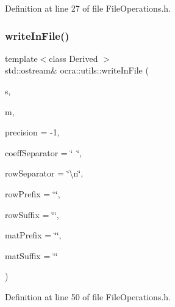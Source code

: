 Definition at line 27 of file File\+Operations.\+h.

\hypertarget{namespaceocra_1_1utils_ac3e209e5a700c28cc6e38d79113017f2}{}\label{namespaceocra_1_1utils_ac3e209e5a700c28cc6e38d79113017f2} 
\subsubsection{\texorpdfstring{write\+In\+File()}{writeInFile()}\hspace{0.1cm}{\footnotesize\ttfamily [2/3]}}
{\footnotesize\ttfamily template$<$class Derived $>$ \\
std\+::ostream\& ocra\+::utils\+::write\+In\+File (\begin{DoxyParamCaption}\item[{std\+::ostream \&}]{s,  }\item[{const Matrix\+Base$<$ Derived $>$ \&}]{m,  }\item[{int}]{precision = {\ttfamily -\/1},  }\item[{const std\+::string \&}]{coeff\+Separator = {\ttfamily \char`\"{}~\char`\"{}},  }\item[{const std\+::string \&}]{row\+Separator = {\ttfamily \char`\"{}\textbackslash{}n\char`\"{}},  }\item[{const std\+::string \&}]{row\+Prefix = {\ttfamily \char`\"{}\char`\"{}},  }\item[{const std\+::string \&}]{row\+Suffix = {\ttfamily \char`\"{}\char`\"{}},  }\item[{const std\+::string \&}]{mat\+Prefix = {\ttfamily \char`\"{}\char`\"{}},  }\item[{const std\+::string \&}]{mat\+Suffix = {\ttfamily \char`\"{}\char`\"{}} }\end{DoxyParamCaption})\hspace{0.3cm}{\ttfamily [inline]}}



Definition at line 50 of file File\+Operations.\+h.

\hypertarget{namespaceocra_1_1utils_af94bc08a67cf20092611bb37f4528b28}{}\label{namespaceocra_1_1utils_af94bc08a67cf20092611bb37f4528b28} 
